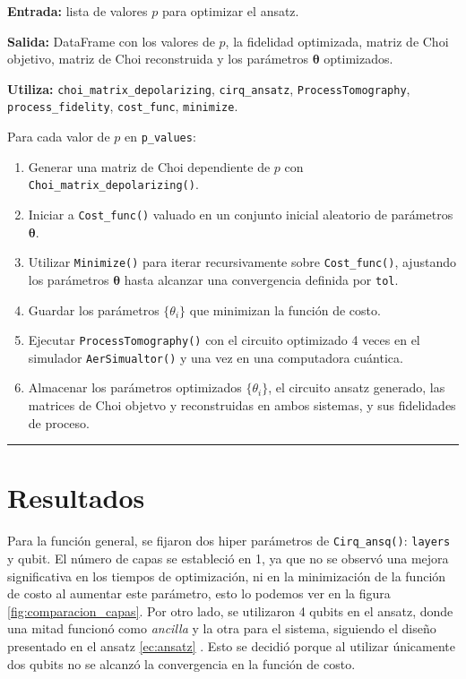 \documentclass[letterpaper,12pt]{thesisECFM}
\theoremstyle{plain}
\theoremstyle{definition}
\theoremstyle{definition}
\theoremstyle{remark}
\newcommand{\1}{\mathbb{1}}
\begin{document}
\noindent\textbf{Entrada:} lista de valores $p$ para optimizar el ansatz.

\noindent\textbf{Salida:} DataFrame con los valores de $p$, la fidelidad
optimizada, matriz de Choi objetivo, matriz de Choi reconstruida y los
parámetros $\bm{\theta}$ optimizados.

\noindent\textbf{Utiliza:} \texttt{choi\_matrix\_depolarizing},
\texttt{cirq\_ansatz}, \texttt{ProcessTomography}, \texttt{process\_fidelity},
\texttt{cost\_func}, \texttt{minimize}. \newline

Para cada valor de $p$ en \texttt{p\_values}: 
\begin{enumerate}
    \item Generar una matriz de Choi dependiente de $p$ con \texttt{Choi\_matrix\_depolarizing()}.
    \item Iniciar a  \texttt{Cost\_func()} valuado en un conjunto inicial
aleatorio de parámetros $\bm{\theta}$. 
   \item Utilizar \texttt{Minimize()} para iterar recursivamente sobre
\texttt{Cost\_func()}, ajustando los parámetros $\bm{\theta}$ hasta alcanzar
una convergencia definida por \texttt{tol}.
   \item Guardar los parámetros $\{ \theta_i\}$ que minimizan la función de
costo. 
   \item Ejecutar \texttt{ProcessTomography()} con el circuito optimizado 4
veces en el simulador \texttt{AerSimualtor()} y una vez en una computadora
cuántica. 
    \item Almacenar los parámetros optimizados $\{ \theta_i\}$, el circuito
ansatz generado, las matrices de Choi objetvo y reconstruidas en ambos
sistemas, y sus fidelidades de proceso. 
\end{enumerate}
\vspace{-.5cm}
\noindent\rule{\textwidth}{1mm}
\section{Resultados} %
Para la función general, se fijaron dos hiper parámetros de
\texttt{Cirq\_ansq()}: \texttt{layers} y  qubit. El número de capas se
estableció en 1, ya que no se observó una mejora significativa en los tiempos
de optimización, ni en la minimización de la función de costo al aumentar este
parámetro, esto lo podemos ver en la figura \ref{fig:comparacion_capas}. Por
otro lado, se utilizaron 4 qubits en el ansatz, donde una mitad
funcionó como \textit{ancilla} y la otra para el sistema, siguiendo el diseño
presentado en el ansatz \ref{ec:ansatz} . Esto se decidió porque al
utilizar únicamente dos  qubits no se alcanzó la convergencia en la función de
costo. 
\end{document}
